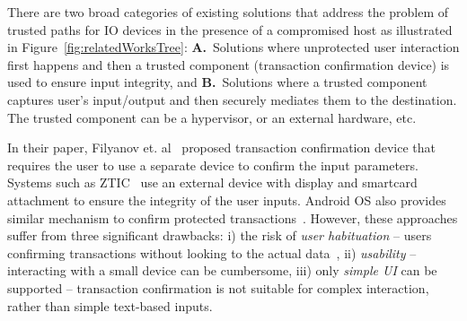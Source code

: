 There are two broad categories of existing solutions that address the problem of trusted paths for IO devices in the presence of a compromised host as illustrated in Figure~\ref{fig:relatedWorksTree}: \textbf{A.}~Solutions where unprotected user interaction first happens and then a trusted component (transaction confirmation device) is used to ensure input integrity,
and \textbf{B.}~Solutions where a trusted component captures user's input/output and then securely mediates them to the destination. The trusted component can be a hypervisor, or an external hardware, etc. 

 In their paper, Filyanov et. al~\cite{filyanov2011uni} proposed transaction confirmation device that requires the user to use a separate device to confirm the input parameters. Systems such as ZTIC~\cite{weigold2011secure} use an external device with display and smartcard attachment to ensure the integrity of the user inputs. Android OS also provides similar mechanism to confirm protected transactions~\cite{android_confirm}. 
However, these approaches suffer from three significant drawbacks: i) the risk of \emph{user habituation} -- users confirming transactions without looking to the actual data~\cite{anderson2016warning},
ii) \emph{usability} -- interacting with a small device can be cumbersome, iii) only \emph{simple UI} can be supported -- transaction confirmation is not suitable for complex interaction, rather than simple text-based inputs.



